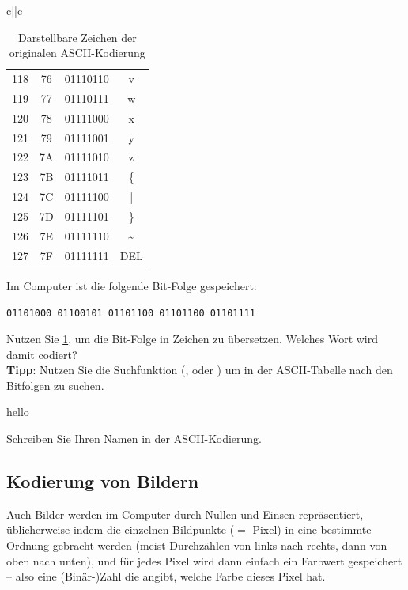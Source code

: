 \begin{table}[H]
{\begin{tabular}{c||c}
\begin{tabular}{cccc}
				118     & 76          & 01110110 & v               \\
				119     & 77          & 01110111 & w               \\
				120     & 78          & 01111000 & x               \\
				121     & 79          & 01111001 & y               \\
				122     & 7A          & 01111010 & z               \\
				123     & 7B          & 01111011 & \{              \\
				124     & 7C          & 01111100 & |               \\
				125     & 7D          & 01111101 & \}              \\
				126     & 7E          & 01111110 & \textasciitilde \\
				127     & 7F          & 01111111 & DEL             \\
				\bottomrule
			\end{tabular}
		\end{tabular}}
	\caption{Darstellbare Zeichen der originalen \gls{ASCII}-Kodierung}
	\label{table:ascii}
\end{table}
\clearpage

\begin{myexercise}
	Im Computer ist die folgende Bit-Folge gespeichert:

	\texttt{01101000 01100101 01101100 01101100 01101111}

	Nutzen Sie \cref{table:ascii}, um die Bit-Folge in Zeichen zu übersetzen. Welches Wort wird damit codiert?\\

	\textbf{Tipp}: Nutzen Sie die Suchfunktion (, oder ) um in der ASCII-Tabelle nach den Bitfolgen zu suchen.
	\begin{myanswer}
		hello
	\end{myanswer}
\end{myexercise}

\begin{myexercise}
	Schreiben Sie Ihren Namen in der \gls{ASCII}-Kodierung.
\end{myexercise}

\subsection{Kodierung von Bildern}

Auch Bilder werden im Computer durch Nullen und Einsen repräsentiert, üblicherweise indem die einzelnen Bildpunkte ($=$ Pixel) in eine bestimmte Ordnung gebracht werden (meist Durchzählen von links nach rechts, dann von oben nach unten), und für jedes Pixel wird dann einfach ein Farbwert gespeichert – also eine (Binär-)Zahl die angibt, welche Farbe dieses Pixel hat.


